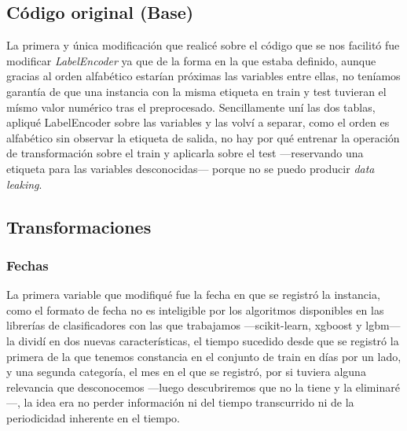 \documentclass{article}
\begin{document}
\subsection{Código original (Base)}

La primera y única modificación que realicé sobre el código que se nos facilitó fue modificar \textit{LabelEncoder} ya que de la forma en la que estaba definido, aunque gracias al orden alfabético estarían próximas las variables entre ellas, no teníamos garantía de que una instancia con la misma etiqueta en train y test tuvieran el mísmo valor numérico tras el preprocesado. Sencillamente uní las dos tablas, apliqué LabelEncoder sobre las variables y las volví a separar, como el orden es alfabético sin observar la etiqueta de salida, no hay por qué entrenar la operación de transformación sobre el train y aplicarla sobre el test ---reservando una etiqueta para las variables desconocidas--- porque no se puedo producir \textit{data leaking}.

\subsection{Transformaciones}

\subsubsection{Fechas}

La primera variable que modifiqué fue la fecha en que se registró la instancia, como el formato de fecha no es inteligible por los algoritmos disponibles en las librerías de clasificadores con las que trabajamos ---scikit-learn, xgboost y lgbm--- la dividí en dos nuevas características, el tiempo sucedido desde que se registró la primera de la que tenemos constancia en el conjunto de train en días por un lado, y una segunda categoría, el mes en el que se registró, por si tuviera alguna relevancia que desconocemos ---luego descubriremos que no la tiene y la eliminaré---, la idea era no perder información ni del tiempo transcurrido ni de la periodicidad inherente en el tiempo.
\end{document}
